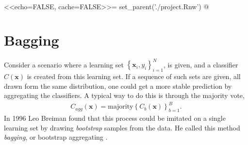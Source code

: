 <<echo=FALSE, cache=FALSE>>=
set_parent('./project.Rnw')
@
\section{Bagging}
\label{sec:Bagging}
Consider a scenario where a learning set $\left\{ \mathbf{x}_i, y_i \right\}_{i=1}^{N}$, is given, and a classifier $C(\mathbf{x})$ is created from this learning set. If a sequence of such sets are given, all drawn form the same distribution, one could get a more stable prediction by aggregating the classifiers. A typical way to do this is through the majority vote,
\begin{align}
  \label{eq:aggClass} 
  C_{agg}(\mathbf{x}) = \mathrm{majority} \left\{ C_b(\mathbf{x}) \right\}_{b=1}^{B}.
\end{align}
In 1996 Leo Breiman found that this process could be imitated on a single learning set by drawing \textit{bootstrap} samples from the data. He called this method \textit{bagging}, or bootstrap aggregating \cite{Breiman1996}. 

